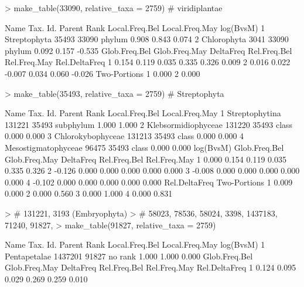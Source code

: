 \documentclass{article}
\begin{document}
\begin{Schunk}
\begin{Sinput}
> make_table(33090, relative_taxa = 2759) # viridiplantae
\end{Sinput}
\begin{Soutput}
          Name Tax. Id. Parent   Rank Local.Freq.Bel Local.Freq.May log(BvsM)
1 Streptophyta    35493  33090 phylum          0.908          0.843     0.074
2  Chlorophyta     3041  33090 phylum          0.092          0.157    -0.535
  Glob.Freq.Bel Glob.Freq.May DeltaFreq Rel.Freq.Bel Rel.Freq.May Rel.DeltaFreq
1         0.154         0.119     0.035        0.335        0.326         0.009
2         0.016         0.022    -0.007        0.034        0.060        -0.026
  Two-Portions
1        0.000
2        0.000
\end{Soutput}
\begin{Sinput}
> make_table(35493, relative_taxa = 2759) # Streptophyta
\end{Sinput}
\begin{Soutput}
                 Name Tax. Id. Parent      Rank Local.Freq.Bel Local.Freq.May
1      Streptophytina   131221  35493 subphylum          1.000          1.000
2 Klebsormidiophyceae   131220  35493     class          0.000          0.000
3   Chlorokybophyceae   131213  35493     class          0.000          0.000
4 Mesostigmatophyceae    96475  35493     class          0.000          0.000
  log(BvsM) Glob.Freq.Bel Glob.Freq.May DeltaFreq Rel.Freq.Bel Rel.Freq.May
1     0.000         0.154         0.119     0.035        0.335        0.326
2    -0.126         0.000         0.000     0.000        0.000        0.000
3    -0.008         0.000         0.000     0.000        0.000        0.000
4    -0.102         0.000         0.000     0.000        0.000        0.000
  Rel.DeltaFreq Two-Portions
1         0.009        0.000
2         0.000        0.560
3         0.000        1.000
4         0.000        0.831
\end{Soutput}
\begin{Sinput}
> # 131221, 3193 (Embryophyta) 
> # 58023, 78536, 58024, 3398, 1437183, 71240, 91827, 
> make_table(91827, relative_taxa = 2759) 
\end{Sinput}
\begin{Soutput}
          Name Tax. Id. Parent    Rank Local.Freq.Bel Local.Freq.May log(BvsM)
1 Pentapetalae  1437201  91827 no rank          1.000          1.000     0.000
  Glob.Freq.Bel Glob.Freq.May DeltaFreq Rel.Freq.Bel Rel.Freq.May Rel.DeltaFreq
1         0.124         0.095     0.029        0.269        0.259         0.010

\end{Soutput}
\end{Schunk}
\end{document}
